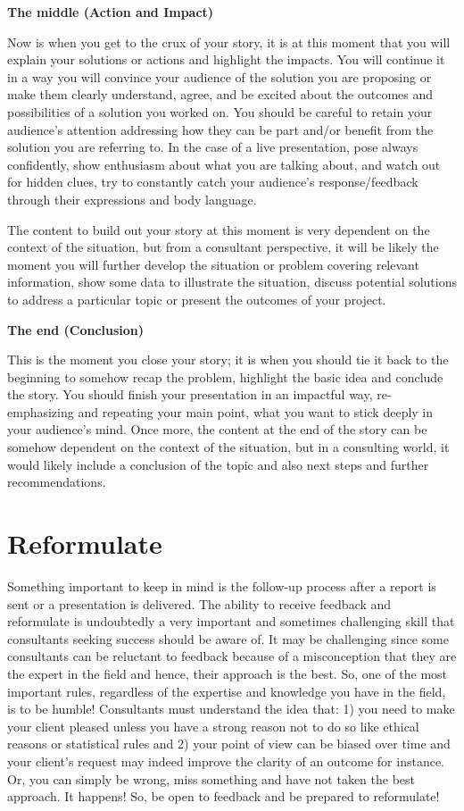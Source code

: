 \documentclass[
]{krantz}
\begin{document}
\textbf{The middle (Action and Impact)}

Now is when you get to the crux of your story, it is at this moment that you will explain your solutions or actions and highlight the impacts. You will continue it in a way you will convince your audience of the solution you are proposing or make them clearly understand, agree, and be excited about the outcomes and possibilities of a solution you worked on. You should be careful to retain your audience's attention addressing how they can be part and/or benefit from the solution you are referring to. In the case of a live presentation, pose always confidently, show enthusiasm about what you are talking about, and watch out for hidden clues, try to constantly catch your audience's response/feedback through their expressions and body language.

The content to build out your story at this moment is very dependent on the context of the situation, but from a consultant perspective, it will be likely the moment you will further develop the situation or problem covering relevant information, show some data to illustrate the situation, discuss potential solutions to address a particular topic or present the outcomes of your project.

\textbf{The end (Conclusion)}

This is the moment you close your story; it is when you should tie it back to the beginning to somehow recap the problem, highlight the basic idea and conclude the story. You should finish your presentation in an impactful way, re-emphasizing and repeating your main point, what you want to stick deeply in your audience's mind. Once more, the content at the end of the story can be somehow dependent on the context of the situation, but in a consulting world, it would likely include a conclusion of the topic and also next steps and further recommendations.

\hypertarget{reformulate2}{%
\section{Reformulate}\label{reformulate2}}

Something important to keep in mind is the follow-up process after a report is sent or a presentation is delivered. The ability to receive feedback and reformulate is undoubtedly a very important and sometimes challenging skill that consultants seeking success should be aware of. It may be challenging since some consultants can be reluctant to feedback because of a misconception that they are the expert in the field and hence, their approach is the best. So, one of the most important rules, regardless of the expertise and knowledge you have in the field, is to be humble! Consultants must understand the idea that: 1) you need to make your client pleased unless you have a strong reason not to do so like ethical reasons or statistical rules and 2) your point of view can be biased over time and your client's request may indeed improve the clarity of an outcome for instance. Or, you can simply be wrong, miss something and have not taken the best approach. It happens! So, be open to feedback and be prepared to reformulate!
\end{document}
